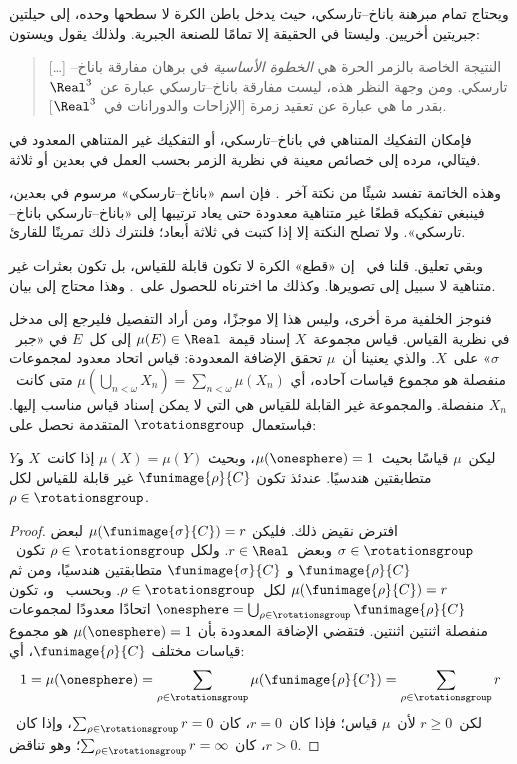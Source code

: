 \documentclass[../../../include/open-logic-section]{subfiles}
\begin{document}
ويحتاج تمام مبرهنة باناخ--تارسكي، حيث يدخل باطن الكرة لا سطحها وحده،
إلى حيلتين جبريتين أخريين. وليستا في الحقيقة إلا تمامًا للصنعة
الجبرية. ولذلك يقول ويستون:
\begin{quote}	
  [\ldots] النتيجة الخاصة بالزمر الحرة هي \emph{الخطوة الأساسية} في
  برهان مفارقة باناخ--تارسكي. ومن وجهة النظر هذه، ليست مفارقة
  باناخ--تارسكي عبارة عن~$\Real^3$ بقدر ما هي عبارة عن تعقيد زمرة
  [الإزاحات والدورانات في~$\Real^3$]. \cite[p.~16]{Weston2003}
\end{quote}
فإمكان التفكيك المتناهي في باناخ--تارسكي، أو التفكيك غير المتناهي
المعدود في فيتالي، مرده إلى خصائص معينة في نظرية الزمر بحسب العمل في
بعدين أو ثلاثة.

وهذه الخاتمة تفسد شيئًا من نكتة آخر~. فإن اسم
«باناخ--تارسكي» مرسوم في بعدين، فينبغي تفكيكه قطعًا غير متناهية معدودة
حتى يعاد ترتيبها إلى «باناخ--تارسكي باناخ--تارسكي». ولا تصلح النكتة
إلا إذا كتبت في ثلاثة أبعاد؛ فلنترك ذلك تمرينًا للقارئ.

وبقي تعليق. قلنا في~ إن «قطع» الكرة لا تكون قابلة
للقياس، بل تكون بعثرات غير متناهية لا سبيل إلى تصويرها. وكذلك ما
اخترناه للحصول على~. وهذا محتاج إلى بيان.

فنوجز الخلفية مرة أخرى، وليس هذا إلا موجزًا، ومن أراد التفصيل فليرجع
إلى مدخل في نظرية القياس. قياس مجموعة~$X$ إسناد قيمة~$\mu(E) \in \Real$
إلى كل~$E$ في «جبر~$\sigma$» على~$X$. والذي يعنينا أن~$\mu$ تحقق
الإضافة المعدودة: قياس اتحاد معدود لمجموعات منفصلة هو مجموع قياسات
آحاده، أي
$\mu(\bigcup_{n < \omega} X_n) = \sum_{n < \omega}\mu(X_n)$ متى
كانت~$X_n$ منفصلة. والمجموعة غير القابلة للقياس هي التي لا يمكن إسناد
قياس مناسب إليها. فباستعمال~$\rotationsgroup$ المتقدمة نحصل على:

\begin{cor}[فيتالي]
ليكن~$\mu$ قياسًا بحيث~$\mu(\onesphere) = 1$، وبحيث
$\mu(X) = \mu(Y)$ إذا كانت~$X$ و$Y$ متطابقتين هندسيًا. عندئذ تكون
$\funimage{\rho}{C}$ غير قابلة للقياس لكل
$\rho \in \rotationsgroup$.
\end{cor}

\begin{proof}
افترض نقيض ذلك. فليكن
$\mu(\funimage{\sigma}{C}) = r$ لبعض
$\sigma \in \rotationsgroup$ وبعض~$r \in \Real$. ولكل
$\rho \in \rotationsgroup$ تكون~$\funimage{\rho}{C}$ و
$\funimage{\sigma}{C}$ متطابقتين هندسيًا، ومن ثم
$\mu(\funimage{\rho}{C}) = r$ لكل~$\rho \in \rotationsgroup$.
وبحسب~ و، تكون
$\onesphere =
\bigcup_{\rho \in \rotationsgroup}\funimage{\rho}{C}$ اتحادًا
معدودًا لمجموعات منفصلة اثنتين اثنتين. فتقضي الإضافة المعدودة بأن
$\mu(\onesphere) = 1$ هو مجموع قياسات مختلف
$\funimage{\rho}{C}$، أي:
\[
	1 = \mu(\onesphere) = \sum_{\rho \in \rotationsgroup}\mu(\funimage{\rho}{C}) = \sum_{\rho \in \rotationsgroup}r
\]
لكن~$r \geq 0$ لأن~$\mu$ قياس؛ فإذا كان~$r = 0$، كان
$\sum_{\rho \in \rotationsgroup}r = 0$، وإذا كان~$r > 0$، كان
$\sum_{\rho \in \rotationsgroup}r = \infty$؛ وهو تناقض.
\end{proof}
\end{document}
